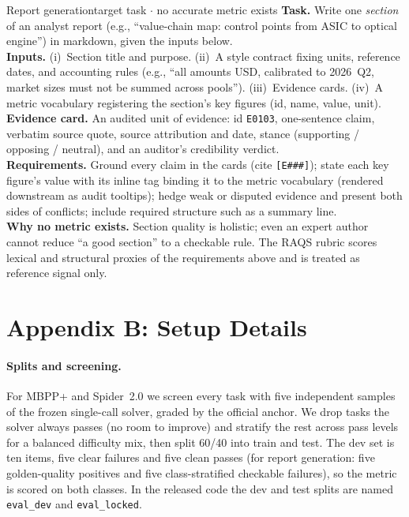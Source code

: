 \documentclass[letterpaper]{article} %
\newcommand{\cardsub}[1]{\hfill{\normalfont\footnotesize\color{inkmut}#1}}
\begin{document}
\begin{taskbox}{Report generation\cardsub{target task $\cdot$ no accurate metric exists}}
\small
\textbf{Task.} Write one \emph{section} of an analyst report (e.g., ``value-chain map: control points from ASIC to optical engine'') in markdown, given the inputs below.\\[2pt]
\textbf{Inputs.} (i)~Section title and purpose. (ii)~A style contract fixing units, reference dates, and accounting rules (e.g., ``all amounts USD, calibrated to 2026~Q2, market sizes must not be summed across pools''). (iii)~Evidence cards. (iv)~A metric vocabulary registering the section's key figures (id, name, value, unit).\\[2pt]
\textbf{Evidence card.} An audited unit of evidence: id \texttt{E0103}, one-sentence claim, verbatim source quote, source attribution and date, stance (supporting / opposing / neutral), and an auditor's credibility verdict.\\[2pt]
\textbf{Requirements.} Ground every claim in the cards (cite \texttt{[E\#\#\#]}); state each key figure's value with its inline tag binding it to the metric vocabulary (rendered downstream as audit tooltips); hedge weak or disputed evidence and present both sides of conflicts; include required structure such as a summary line.\\[2pt]
\textbf{Why no metric exists.} Section quality is holistic; even an expert author cannot reduce ``a good section'' to a checkable rule. The RAQS rubric scores lexical and structural proxies of the requirements above and is treated as reference signal only.
\end{taskbox}

\section{Appendix B: Setup Details}
\label{app:setup}

\paragraph{Splits and screening.}
For MBPP+ and Spider~2.0 we screen every task with five independent samples of the frozen single-call solver, graded by the official anchor. We drop tasks the solver always passes (no room to improve) and stratify the rest across pass levels for a balanced difficulty mix, then split 60/40 into train and test. The dev set is ten items, five clear failures and five clean passes (for report generation: five golden-quality positives and five class-stratified checkable failures), so the metric is scored on both classes. In the released code the dev and test splits are named \texttt{eval\_dev} and \texttt{eval\_locked}.
\end{document}

